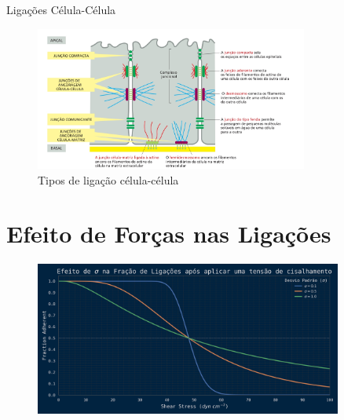 \documentclass[aspectratio=169]{beamer}
\begin{document}
\begin{frame}{Ligações Célula-Célula}
    \begin{figure}
        \includegraphics[width=0.8\textwidth]{img/bio/celula_celula.jpg}
        \caption{Tipos de ligação célula-célula}
    \end{figure}
\end{frame}

\section{Efeito de Forças nas Ligações}
\begin{frame}
    \begin{figure}
        \includegraphics[width=0.9\textwidth]{img/sigma_cisalhamento.png}
    \end{figure}
\end{frame}
\end{document}
